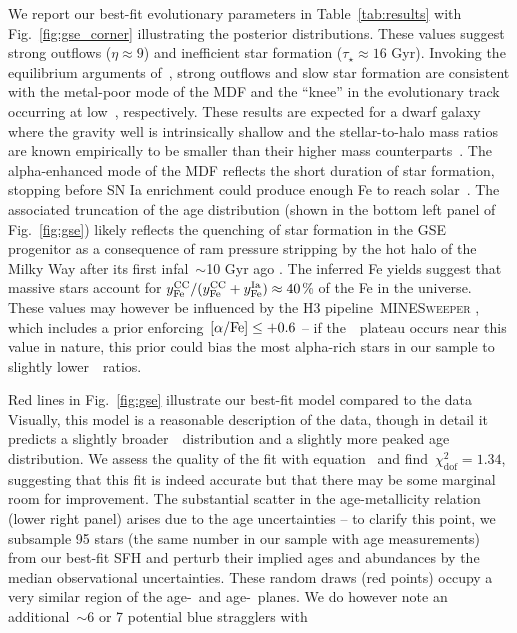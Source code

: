 \documentclass[ms.tex]{subfiles}
\begin{document}
We report our best-fit evolutionary parameters in Table~\ref{tab:results}
with Fig.~\ref{fig:gse_corner} illustrating the posterior distributions.
These values suggest strong outflows ($\eta \approx 9$) and inefficient star
formation ($\tau_\star \approx 16$ Gyr).
Invoking the equilibrium arguments of~\citet{Weinberg2017}, strong outflows and
slow star formation are consistent with the metal-poor mode of the MDF and the
``knee'' in the evolutionary track occurring at low~\feh, respectively.
These results are expected for a dwarf galaxy where the gravity well is
intrinsically shallow and the stellar-to-halo mass ratios are known empirically
to be smaller than their higher mass counterparts~\citep{Hudson2015}.
The alpha-enhanced mode of the MDF reflects the short duration of star
formation, stopping before SN Ia enrichment could produce enough Fe to reach
solar~\afe.
The associated truncation of the age distribution (shown in the bottom left
panel of Fig.~\ref{fig:gse}) likely reflects the quenching of star
formation in the GSE progenitor as a consequence of ram pressure stripping by
the hot halo of the Milky Way after its first infal~$\sim$10 Gyr ago
\citep{Bonaca2020}.
The inferred Fe yields suggest that massive stars account for
$y_\text{Fe}^\text{CC} / (y_\text{Fe}^\text{CC} + y_\text{Fe}^\text{Ia}) \approx 40$\% of the Fe in the universe.
These values may however be influenced by the H3 pipeline~\textsc{MINESweeper}
\citep{Cargile2020}, which includes a prior enforcing~$\text{[$\alpha$/Fe]} \leq +0.6$ -- if
the~\afe~plateau occurs near this value in nature, this prior could bias the
most alpha-rich stars in our sample to slightly lower~\afe~ratios.
\par
Red lines in Fig.~\ref{fig:gse} illustrate our best-fit model compared to the
data
Visually, this model is a reasonable description of the data, though in detail
it predicts a slightly broader~\feh~distribution and a slightly more peaked age
distribution.
We assess the quality of the fit with equation~ and
find~$\chi_\text{dof}^2 = 1.34$, suggesting that this fit is indeed accurate
but that there may be some marginal room for improvement.
The substantial scatter in the age-metallicity relation (lower right panel)
arises due to the age uncertainties -- to clarify this point, we subsample 95
stars (the same number in our sample with age measurements) from our best-fit
SFH and perturb their implied ages and abundances by the median observational
uncertainties.
These random draws (red points) occupy a very similar region of the age-\feh~and
age-\afe~planes.
We do however note an additional~$\sim$6 or 7 potential blue stragglers with
\end{document}
